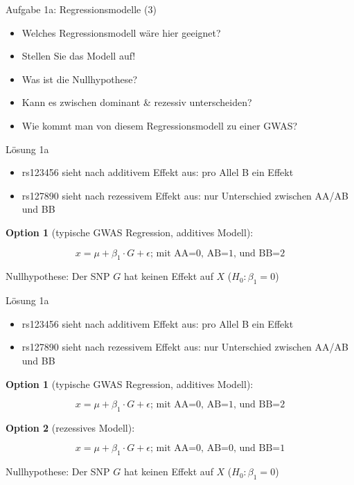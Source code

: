 \documentclass{beamer}
\begin{document}
\begin{frame}{Aufgabe 1a: Regressionsmodelle (3)}
\begin{itemize}
    \item Welches Regressionsmodell wäre hier geeignet?
    \item Stellen Sie das Modell auf! 
    \item Was ist die Nullhypothese?
    \item Kann es zwischen dominant \& rezessiv unterscheiden?
    \item Wie kommt man von diesem Regressionsmodell zu einer GWAS?
\end{itemize}
\end{frame}

\begin{frame}{Lösung 1a}
\begin{itemize}
    \item rs123456 sieht nach additivem Effekt aus: pro Allel B ein Effekt
    \item rs127890 sieht nach rezessivem Effekt aus: nur Unterschied zwischen AA/AB und BB
\end{itemize}

\textbf{Option 1} (typische GWAS Regression, additives Modell):

$$ x = \mu + \beta_1 \cdot G + \epsilon \text{; mit AA=0, AB=1, und BB=2}$$

Nullhypothese: Der SNP $G$ hat keinen Effekt auf $X$ ($H_0: \beta_1 = 0$)

\end{frame}

\begin{frame}{Lösung 1a}
\begin{itemize}
    \item rs123456 sieht nach additivem Effekt aus: pro Allel B ein Effekt
    \item rs127890 sieht nach rezessivem Effekt aus: nur Unterschied zwischen AA/AB und BB
\end{itemize}

\textbf{Option 1} (typische GWAS Regression, additives Modell):

$$ x = \mu + \beta_1 \cdot G + \epsilon \text{; mit AA=0, AB=1, und BB=2}$$

\textbf{Option 2} (rezessives Modell):

$$ x = \mu + \beta_1 \cdot G + \epsilon \text{; mit AA=0, AB=0, und BB=1}$$

Nullhypothese: Der SNP $G$ hat keinen Effekt auf $X$ ($H_0: \beta_1 = 0$)

\end{frame}
\end{document}

